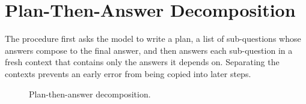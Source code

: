 \chapter{Plan-Then-Answer Decomposition}
\label{ch:method}

The procedure first asks the model to write a plan, a list of sub-questions whose answers
compose to the final answer, and then answers each sub-question in a fresh context that
contains only the answers it depends on. Separating the contexts prevents an early error from
being copied into later steps.

\begin{figure}[htbp]
  \centering
  \caption{Plan-then-answer decomposition.}
  \label{fig:plan}
\end{figure}
